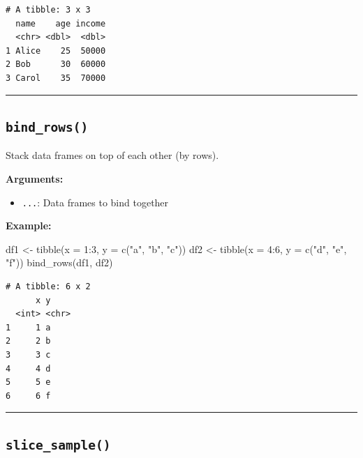 \documentclass[
  letterpaper,
  DIV=11,
  numbers=noendperiod]{scrreprt}
\newenvironment{Shaded}{\begin{snugshade}}{\end{snugshade}}
\newcommand{\AttributeTok}[1]{\textcolor[rgb]{0.40,0.45,0.13}{#1}}
\newcommand{\DecValTok}[1]{\textcolor[rgb]{0.68,0.00,0.00}{#1}}
\newcommand{\FunctionTok}[1]{\textcolor[rgb]{0.28,0.35,0.67}{#1}}
\newcommand{\NormalTok}[1]{\textcolor[rgb]{0.00,0.23,0.31}{#1}}
\newcommand{\OtherTok}[1]{\textcolor[rgb]{0.00,0.23,0.31}{#1}}
\newcommand{\SpecialCharTok}[1]{\textcolor[rgb]{0.37,0.37,0.37}{#1}}
\newcommand{\StringTok}[1]{\textcolor[rgb]{0.13,0.47,0.30}{#1}}
\providecommand{\tightlist}{%
  \setlength{\itemsep}{0pt}\setlength{\parskip}{0pt}}
\begin{document}
\begin{verbatim}
# A tibble: 3 x 3
  name    age income
  <chr> <dbl>  <dbl>
1 Alice    25  50000
2 Bob      30  60000
3 Carol    35  70000
\end{verbatim}

\begin{center}\rule{0.5\linewidth}{0.5pt}\end{center}

\subsection{\texorpdfstring{\texttt{bind\_rows()}}{bind\_rows()}}\label{bind_rows}

Stack data frames on top of each other (by rows).

\textbf{Arguments:}

\begin{itemize}
\tightlist
\item
  \texttt{...}: Data frames to bind together
\end{itemize}

\textbf{Example:}

\begin{Shaded}
\begin{Highlighting}[]
\NormalTok{df1 }\OtherTok{\textless{}{-}} \FunctionTok{tibble}\NormalTok{(}\AttributeTok{x =} \DecValTok{1}\SpecialCharTok{:}\DecValTok{3}\NormalTok{, }\AttributeTok{y =} \FunctionTok{c}\NormalTok{(}\StringTok{"a"}\NormalTok{, }\StringTok{"b"}\NormalTok{, }\StringTok{"c"}\NormalTok{))}
\NormalTok{df2 }\OtherTok{\textless{}{-}} \FunctionTok{tibble}\NormalTok{(}\AttributeTok{x =} \DecValTok{4}\SpecialCharTok{:}\DecValTok{6}\NormalTok{, }\AttributeTok{y =} \FunctionTok{c}\NormalTok{(}\StringTok{"d"}\NormalTok{, }\StringTok{"e"}\NormalTok{, }\StringTok{"f"}\NormalTok{))}
\FunctionTok{bind\_rows}\NormalTok{(df1, df2)}
\end{Highlighting}
\end{Shaded}

\begin{verbatim}
# A tibble: 6 x 2
      x y    
  <int> <chr>
1     1 a    
2     2 b    
3     3 c    
4     4 d    
5     5 e    
6     6 f    
\end{verbatim}

\begin{center}\rule{0.5\linewidth}{0.5pt}\end{center}

\subsection{\texorpdfstring{\texttt{slice\_sample()}}{slice\_sample()}}\label{slice_sample}
\end{document}
